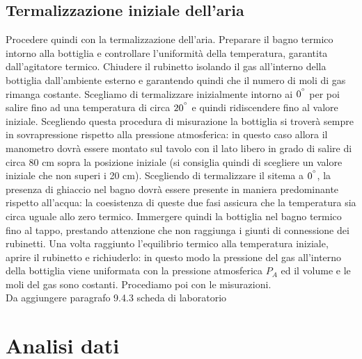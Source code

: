 \subsection{Termalizzazione iniziale dell'aria}
Procedere quindi con la termalizzazione dell'aria.
Preparare il bagno termico intorno alla bottiglia e controllare l'uniformità della temperatura, garantita dall'agitatore termico.
Chiudere il rubinetto isolando il gas all'interno della bottiglia dall'ambiente esterno e garantendo quindi che il numero di moli di gas rimanga costante.
Scegliamo di termalizzare inizialmente intorno ai $0^{\degree}$ per poi salire fino ad una temperatura di circa $20^{\degree}$ e quindi ridiscendere fino al valore iniziale.
Scegliendo questa procedura di misurazione la bottiglia si troverà sempre in sovrapressione rispetto alla pressione atmosferica: in questo caso allora il manometro dovrà essere montato sul tavolo con il lato libero in grado di salire di circa 80 cm sopra la posizione iniziale (si consiglia quindi di scegliere un valore iniziale che non superi i 20 cm).
Scegliendo di termalizzare il sitema a $0^{\degree}$, la presenza di ghiaccio nel bagno dovrà essere presente in maniera predominante rispetto all'acqua: la coesistenza di queste due fasi assicura che la temperatura sia circa uguale allo zero termico.
Immergere quindi la bottiglia nel bagno termico fino al tappo, prestando attenzione che non raggiunga i giunti di connessione dei rubinetti.
Una volta raggiunto l'equilibrio termico alla temperatura iniziale, aprire il rubinetto e richiuderlo: in questo modo la pressione del gas all'interno della bottiglia viene uniformata con la pressione atmosferica $P_{A}$ ed il volume e le moli del gas sono costanti. 
Procediamo poi con le misurazioni.\\
Da aggiungere paragrafo 9.4.3 scheda di laboratorio


\section{Analisi dati}

